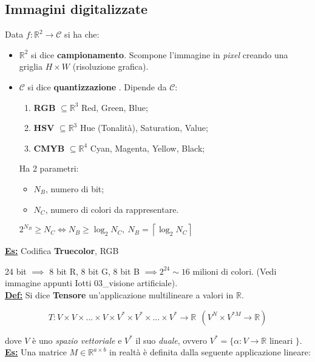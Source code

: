 \documentclass[a4paper,12pt]{article}
\newcommand{\definizione}{\noindent\textbf{\underline{Def:}} }
\newcommand{\esempio}{\noindent\textbf{\underline{Es:}} }
\begin{document}
	\subsection{Immagini digitalizzate}

	Data $f : \mathbb{R}^2 \rightarrow \mathcal{C}$ si ha che:

	\begin{itemize}
		\item $\mathbb{R}^2$ si dice \textbf{campionamento}. Scompone l'immagine in \textit{pixel} creando una griglia $H \times W$ (risoluzione grafica).
		\item $\mathcal{C}$ si dice \textbf{quantizzazione} . Dipende da $\mathcal{C}$:
		\begin{enumerate}
			\item \textbf{RGB} $\subseteq \mathbb{R}^3$ Red, Green, Blue;
			\item \textbf{HSV} $ \subseteq \mathbb{R}^3$ Hue (Tonalità), Saturation, Value;
			\item \textbf{CMYB} $ \subseteq \mathbb{R}^4$ Cyan, Magenta, Yellow, Black;
 		\end{enumerate}
 		Ha 2 parametri:
 		\begin{itemize}
 			\item $N_B$, numero di bit;
 			\item $N_C$, numero di colori da rappresentare.
 		\end{itemize}
 		$ 2^{N_B} \geq N_C \iff N_B \geq \log_2 N_C, \ N_B = \left\lceil \log_2 N_C \right\rceil$
	\end{itemize}

	\esempio Codifica \textbf{Truecolor}, RGB

	24 bit $ \implies $ 8 bit R, 8 bit G, 8 bit B $\implies 2^{24} \sim 16$ milioni di colori. (Vedi immagine appunti Iotti 03\_visione artificiale). \\

	\definizione Si dice \textbf{Tensore} un'applicazione multilineare a valori in $\mathbb{R}$.

	\[
	T : V \times V \times ... \times V \times V^* \times V^* \times ... \times V^* \rightarrow \mathbb{R}\ \ (V^N \times V^{*M} \rightarrow \mathbb{R})
	\]

	dove $V$ è uno \textit{spazio vettoriale} e $V^*$ il suo \textit{duale}, ovvero $V^* = \{ \alpha : V \rightarrow \mathbb{R} \text{ lineari }\}$. \\

	\esempio Una matrice $M \in \mathbb{R}^{a \times b}$ in realtà è definita dalla seguente applicazione lineare:
\end{document}
